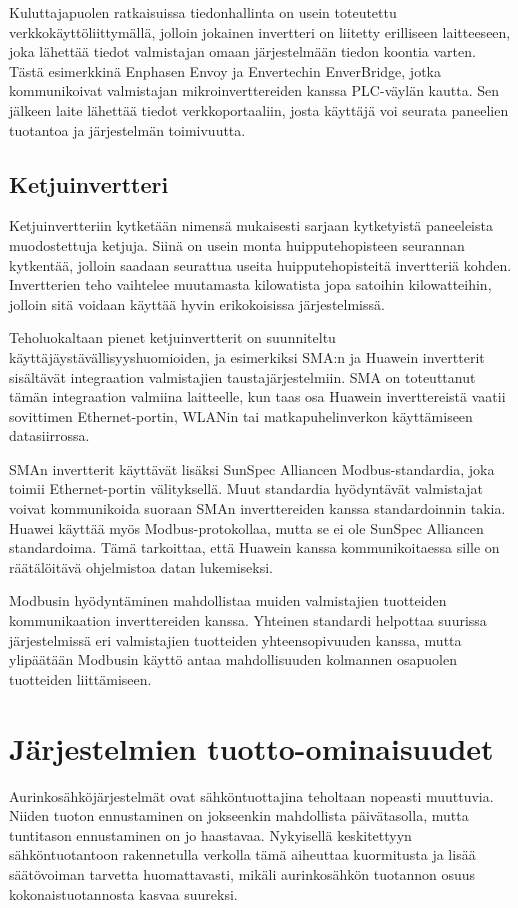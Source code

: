   Kuluttajapuolen ratkaisuissa tiedonhallinta on usein toteutettu verkkokäyttöliittymällä, jolloin jokainen invertteri on liitetty erilliseen laitteeseen, joka lähettää tiedot valmistajan omaan järjestelmään tiedon koontia varten. Tästä esimerkkinä Enphasen Envoy ja Envertechin EnverBridge, jotka kommunikoivat valmistajan mikroinverttereiden kanssa PLC-väylän kautta. Sen jälkeen laite lähettää tiedot verkkoportaaliin, josta käyttäjä voi seurata paneelien tuotantoa ja järjestelmän toimivuutta.

\subsection{Ketjuinvertteri}
  Ketjuinvertteriin kytketään nimensä mukaisesti sarjaan kytketyistä paneeleista muodostettuja ketjuja. Siinä on usein monta huipputehopisteen seurannan kytkentää, jolloin saadaan seurattua useita huipputehopisteitä invertteriä kohden. Invertterien teho vaihtelee muutamasta kilowatista jopa satoihin kilowatteihin, jolloin sitä voidaan käyttää hyvin erikokoisissa järjestelmissä.

  Teholuokaltaan pienet ketjuinvertterit on suunniteltu käyttäjäystävällisyyshuomioiden, ja esimerkiksi SMA:n ja Huawein invertterit sisältävät integraation valmistajien taustajärjestelmiin. SMA on toteuttanut tämän integraation valmiina laitteelle, kun taas osa Huawein inverttereistä vaatii sovittimen Ethernet-portin, WLANin tai matkapuhelinverkon käyttämiseen datasiirrossa.

  SMAn invertterit käyttävät lisäksi SunSpec Alliancen Modbus-standardia, joka toimii Ethernet-portin välityksellä. Muut standardia hyödyntävät valmistajat voivat kommunikoida suoraan SMAn inverttereiden kanssa standardoinnin takia. Huawei käyttää myös Modbus-protokollaa, mutta se ei ole SunSpec Alliancen standardoima. Tämä tarkoittaa, että Huawein kanssa kommunikoitaessa sille on räätälöitävä ohjelmistoa datan lukemiseksi.

  Modbusin hyödyntäminen mahdollistaa muiden valmistajien tuotteiden kommunikaation inverttereiden kanssa. Yhteinen standardi helpottaa suurissa järjestelmissä eri valmistajien tuotteiden yhteensopivuuden kanssa, mutta ylipäätään Modbusin käyttö antaa mahdollisuuden kolmannen osapuolen tuotteiden liittämiseen.

\section{Järjestelmien tuotto-ominaisuudet}
  Aurinkosähköjärjestelmät ovat sähköntuottajina teholtaan nopeasti muuttuvia. Niiden tuoton ennustaminen on jokseenkin mahdollista päivätasolla, mutta tuntitason ennustaminen on jo haastavaa. Nykyisellä keskitettyyn sähköntuotantoon rakennetulla verkolla tämä aiheuttaa kuormitusta ja lisää säätövoiman tarvetta huomattavasti, mikäli aurinkosähkön tuotannon osuus kokonaistuotannosta kasvaa suureksi.

